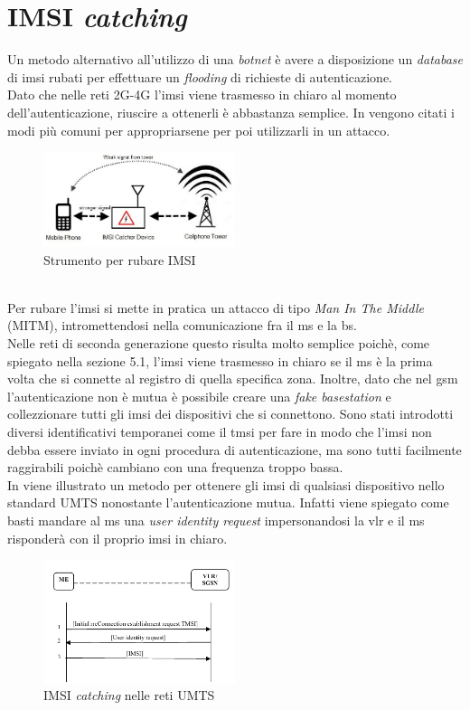 \section{IMSI \textit{catching}}
Un metodo alternativo all'utilizzo di una \textit{botnet} è avere a disposizione un \textit{database} di \gls{imsi} rubati per effettuare un \textit{flooding} di richieste di autenticazione.\\
Dato che nelle reti 2G-4G l'\gls{imsi} viene trasmesso in chiaro al momento dell'autenticazione, riuscire a ottenerli è abbastanza semplice.
In \cite{imsi-catcher} vengono citati i modi più comuni per appropriarsene per poi utilizzarli in un 
attacco.
\begin{figure}[h]
    \centering
    \includegraphics[width=0.5\textwidth]{images/imsi-catcher.jpg}
    \caption{Strumento per rubare IMSI}
\end{figure}\\
Per rubare l'\gls{imsi} si mette in pratica un attacco di tipo \textit{Man In The Middle} (MITM), intromettendosi nella comunicazione fra il \gls{ms} e la \gls{bs}.\\
Nelle reti di seconda generazione questo risulta molto semplice poichè, come spiegato nella sezione 5.1, l'\gls{imsi} viene trasmesso in chiaro se il \gls{ms} è la prima volta che si connette al registro di quella specifica
zona. Inoltre, dato che nel \gls{gsm} l'autenticazione non è mutua è possibile creare una \textit{fake basestation} e collezzionare tutti gli \gls{imsi} dei dispositivi che si connettono.
Sono stati introdotti diversi identificativi temporanei come il \gls{tmsi} per fare in modo che l'\gls{imsi} non debba essere inviato in ogni procedura di autenticazione, ma sono tutti facilmente raggirabili poichè cambiano con una
frequenza troppo bassa.\\
In \cite{dos-imsi} viene illustrato un metodo per ottenere gli \gls{imsi} di qualsiasi dispositivo nello standard UMTS nonostante l'autenticazione mutua. Infatti viene spiegato come basti mandare al \gls{ms} una \textit{user identity request} impersonandosi 
la \gls{vlr} e il \gls{ms} risponderà con il proprio \gls{imsi} in chiaro.
\begin{figure}[h]
    \centering
    \includegraphics[width=0.5\textwidth]{images/imsi-catch-umts.png}
    \caption{IMSI \textit{catching} nelle reti UMTS\cite{dos-imsi}}
\end{figure}\\

